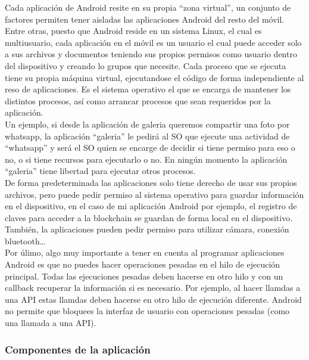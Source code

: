 Cada aplicación de Android resite en su propia ``zona virtual'', un conjunto de factores permiten tener aisladas las aplicaciones Android del resto del móvil. Entre otras, puesto que Android reside en un sistema Linux, el cual es multiusuario, cada aplicación en el móvil es un usuario el cual puede acceder solo a sus archivos y documentos teniendo sus propios permisos como usuario dentro del dispositivo y creando lo grupos que necesite. Cada proceso que se ejecuta tiene su propia máquina virtual, ejecutandose el código de forma independiente al reso de aplicaciones. Es el sistema operativo el que se encarga de mantener los distintos procesos, así como arrancar procesos que sean requeridos por la aplicación. \\

Un ejemplo, si desde la aplicación de galeria queremos compartir una foto por whatsapp, la aplicación ``galeria'' le pedirá al SO que ejecute una actividad de ``whatsapp'' y será el SO quien se encarge de decidir si tiene permiso para eso o no, o si tiene recursos para ejecutarlo o no. En ningún momento la aplicación ``galeria'' tiene libertad para ejecutar otros procesos. \\

De forma predeterminada las aplicaciones solo tiene derecho de usar sus propios archivos, pero puede pedir permiso al sistema operativo para guardar información en el dispositivo, en el caso de mi aplicación Android por ejemplo, el registro de claves para acceder a la blockchain se guardan de forma local en el dispositivo. También, la aplicaciones pueden pedir permiso para utilizar cámara, conexión bluetooth\dots \\

Por úlimo, algo muy importante a tener en cuenta al programar aplicaciones Android es que no puedes hacer operaciones pesadas en el hilo de ejecución principal. Todas las ejecuciones pesadas deben hacerse en otro hilo y con un callback recuperar la información si es necesario. Por ejemplo, al hacer llamdas a una API estas llamdas deben hacerse en otro hilo de ejecución diferente. Android no permite que bloquees la interfaz de usuario con operaciones pesadas (como una llamada a una API).

\subsubsection{Componentes de la aplicación}


